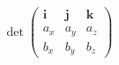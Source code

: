 \documentclass[preview]{standalone}
\begin{document}
\begin{align*}
\det \begin{pmatrix} \mathbf{i} & \mathbf{j} & \mathbf{k} \\ a_x & a_y & a_z \\ b_x & b_y & b_z \end{pmatrix}
\end{align*}
\end{document}
